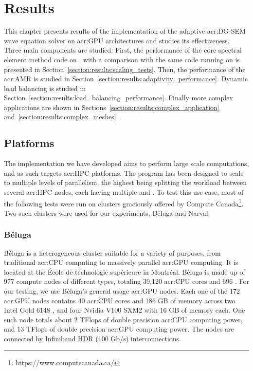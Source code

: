 \chapter{Results}\label{chapter:results}

This chapter presents results of the implementation of the adaptive \acrshort{acr:DG-SEM} wave
equation solver on \acrshort{acr:GPU} architectures and studies its effectiveness. Three main
components are studied. First, the performance of the core spectral element method code on
, with a comparison with the same code running on  is
presented in Section~\ref{section:results:scaling_tests}. Then, the performance of the
\acrlong{acr:AMR} is studied in Section~\ref{section:results:adaptivity_performance}. Dynamic load
balancing is studied in Section~\ref{section:results:load_balancing_performance}. Finally more
complex applications are shown in Sections~\ref{section:results:complex_application}
and~\ref{section:results:complex_meshes}.

\section{Platforms}\label{section:results:platforms}

The implementation we have developed aims to perform large scale computations, and as such targets
\acrshort{acr:HPC} platforms. The program has been designed to scale to multiple levels of
parallelism, the highest being splitting the workload between several \acrshort{acr:HPC} nodes, each
having multiple  and . To test this use case, most of the
following tests were run on clusters graciously offered by Compute
Canada\footnote{https://www.computecanada.ca/}. Two such clusters were used for our experiments,
Béluga and Narval.

\subsection{Béluga}\label{subsection:results:platforms:beluga}

Béluga is a heterogeneous cluster suitable for a variety of purposes, from traditional
\acrshort{acr:CPU} computing to massively parallel \acrshort{acr:GPU} computing. It is located at
the École de technologie supérieure in Montréal. Béluga is made up of 977 compute nodes of different
types, totaling 39,120 \acrshort{acr:CPU} cores and 696 . For our testing, we
use Béluga's general usage \acrshort{acr:GPU} nodes. Each one of the 172 \acrshort{acr:GPU} nodes
contains 40 \acrshort{acr:CPU} cores and 186 GB of memory across two Intel Gold 6148
, and four Nvidia V100 SXM2  with 16 GB of memory each. One
such node totals about 2 TFlops of double precision \acrshort{acr:CPU} computing power, and 13
TFlops of double precision \acrshort{acr:GPU} computing power. The nodes are connected by Infiniband
HDR (100 Gb/s) interconnections.

